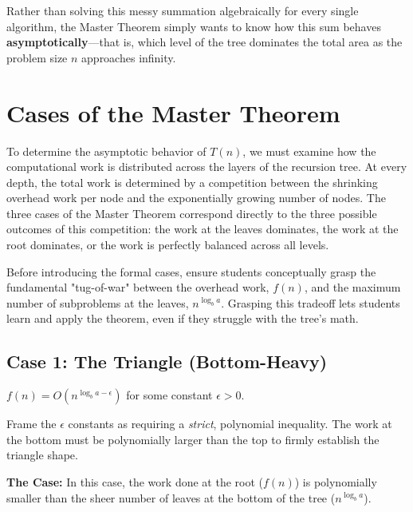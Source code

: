 \documentclass[11pt, a4paper]{article}
\begin{document}
Rather than solving this messy summation algebraically for every single algorithm, the Master Theorem simply wants to know how this sum behaves \textbf{asymptotically}---that is, which level of the tree dominates the total area as the problem size $n$ approaches infinity. 
\newpage
\section*{Cases of the Master Theorem}
To determine the asymptotic behavior of $T(n)$, we must examine how the computational work is distributed across the layers of the recursion tree. At every depth, the total work is determined by a competition between the shrinking overhead work per node and the exponentially growing number of nodes. The three cases of the Master Theorem correspond directly to the three possible outcomes of this competition: the work at the leaves dominates, the work at the root dominates, or the work is perfectly balanced across all levels.

\begin{educatortip}
    Before introducing the formal cases, ensure students conceptually grasp the fundamental "tug-of-war" between the overhead work, $f(n)$, and the maximum number of subproblems at the leaves, $n^{\log_b a}$. Grasping this tradeoff lets students learn and apply the theorem, even if they struggle with the tree's math.
\end{educatortip}

\vspace{0.5cm}
\subsection*{Case 1: The Triangle (Bottom-Heavy)}

\begin{tcolorbox}[colback=accent1!10, colframe=accent1, title=\textbf{Condition}]
$f(n) = O(n^{\log_b a - \epsilon})$ for some constant $\epsilon > 0$.
\end{tcolorbox}
\begin{educatortip}    
Frame the $\epsilon$ constants as requiring a \textit{strict}, polynomial inequality. The work at the bottom must be polynomially larger than the top to firmly establish the triangle shape.
\end{educatortip}
\textbf{The Case:} In this case, the work done at the root ($f(n)$) is polynomially smaller than the sheer number of leaves at the bottom of the tree ($n^{\log_b a}$).
\end{document}
